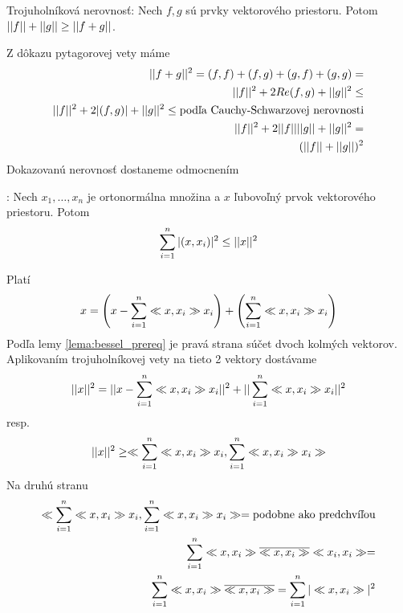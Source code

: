 \begin{lema}
    Trojuholníková nerovnosť: Nech $f,g$ sú prvky vektorového
    priestoru. Potom $||f||+||g|| \ge ||f+g||$.
\end{lema}
\begin{dokaz}
    Z dôkazu pytagorovej vety máme
    \begin{align}
        ||f+g||^2 = ( f,f ) + ( f,g ) + ( g,f ) +
        ( g,g ) =  \\
        ||f||^2 + 2Re( f,g ) + ||g||^2 \le \\
        ||f||^2 + 2|( f,g )| + ||g||^2 \le 
        \text{podľa Cauchy-Schwarzovej nerovnosti}\\
        ||f||^2 + 2||f||||g|| + ||g||^2 = \\
        (||f|| + ||g||)^2
    \end{align}
    Dokazovanú nerovnosť dostaneme odmocnením 
\end{dokaz}

\begin{veta}
    : Nech ${x_1,\dots,x_n}$ je ortonormálna
    množina a $x$ ľubovoľný prvok vektorového priestoru. Potom
    \begin{equation}
        \sum_{i=1}^n |( x,x_i )|^2 \le ||x||^2
    \end{equation}
\end{veta}
\begin{dokaz}
    Platí
    \begin{equation}
        x = \left( x- \sum_{i=1}^n \ll x,x_i \gg x_i\right) +
            \left( \sum_{i=1}^n \ll x,x_i \gg x_i \right)
    \end{equation}
    Podľa lemy \ref{lema:bessel_prereq} je pravá strana súčet
    dvoch kolmých vektorov. Aplikovaním trojuholníkovej vety
    na tieto 2 vektory dostávame
    \begin{equation}
        ||x||^2 =
         ||x- \sum_{i=1}^n \ll x,x_i \gg x_i||^2 +
         ||\sum_{i=1}^n \ll x,x_i \gg x_i||^2
    \end{equation}
    resp.
    \begin{equation}
        ||x||^2 \ge
          \ll \sum_{i=1}^n\ll x,x_i \gg x_i,
          \sum_{i=1}^n\ll x,x_i \gg x_i \gg
    \end{equation}
    Na druhú stranu
    \begin{align}
          \ll \sum_{i=1}^n\ll x,x_i \gg x_i,
          \sum_{i=1}^n\ll x,x_i \gg x_i \gg = \text{podobne ako
          predchvíľou} \\
          \sum_{i=1}^n \ll x,x_i \gg\overline{\ll x,x_i \gg}
            \ll x_i,x_i \gg = \\ 
          \sum_{i=1}^n \ll x,x_i \gg\overline{\ll x,x_i \gg} =
          \sum_{i=1}^n |\ll x,x_i \gg|^2
    \end{align}
\end{dokaz}

